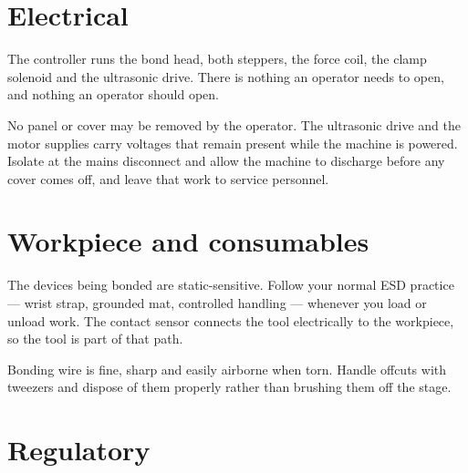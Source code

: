 \section{Electrical}

The controller runs the bond head, both steppers, the force coil, the clamp
solenoid and the ultrasonic drive. There is nothing an operator needs to open,
and nothing an operator should open.

\begin{wbwarning}
No panel or cover may be removed by the operator. The ultrasonic drive and the
motor supplies carry voltages that remain present while the machine is powered.
Isolate at the mains disconnect and allow the machine to discharge before any
cover comes off, and leave that work to service personnel.
\end{wbwarning}


\section{Workpiece and consumables}

\begin{wbwarning}
The devices being bonded are static-sensitive. Follow your normal ESD
practice --- wrist strap, grounded mat, controlled handling --- whenever you
load or unload work. The contact sensor connects the tool electrically to the
workpiece, so the tool is part of that path.
\end{wbwarning}

Bonding wire is fine, sharp and easily airborne when torn. Handle offcuts with
tweezers and dispose of them properly rather than brushing them off the stage.


\section{Regulatory}

